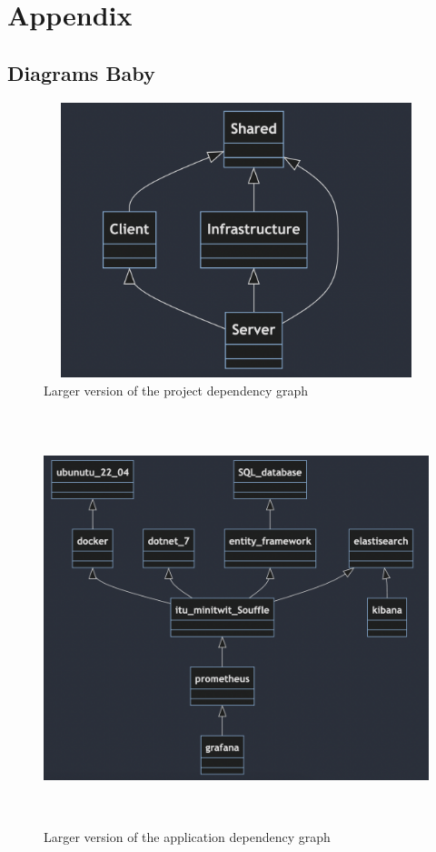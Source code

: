 \section{Appendix}
\subsection{Diagrams Baby}

\begin{figure}[H]
    \centering
    \includegraphics[width = 15.0cm, height = 8.0cm]{Images/onionStructure.png}
    \caption{Larger version of the project dependency graph}
    \label{fig:projectDependencyGraph}
\end{figure}
\begin{figure}[H]
    \centering
    \includegraphics[width = 15.0cm, height = 12.0cm]{Images/application_dependencies.png}
    \caption{Larger version of the application dependency graph}
    \label{fig:ApplicationDependencyGraph}
\end{figure}

